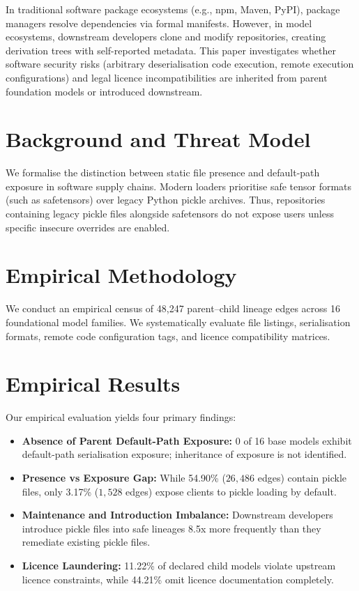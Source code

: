 \documentclass[conference]{IEEEtran}
\begin{document}
In traditional software package ecosystems (e.g., npm, Maven, PyPI), package managers resolve dependencies via formal manifests. However, in model ecosystems, downstream developers clone and modify repositories, creating derivation trees with self-reported metadata. This paper investigates whether software security risks (arbitrary deserialisation code execution, remote execution configurations) and legal licence incompatibilities are inherited from parent foundation models or introduced downstream.

\section{Background and Threat Model}
We formalise the distinction between static file presence and default-path exposure in software supply chains. Modern loaders prioritise safe tensor formats (such as safetensors) over legacy Python pickle archives. Thus, repositories containing legacy pickle files alongside safetensors do not expose users unless specific insecure overrides are enabled.

\section{Empirical Methodology}
We conduct an empirical census of 48,247 parent--child lineage edges across 16 foundational model families. We systematically evaluate file listings, serialisation formats, remote code configuration tags, and licence compatibility matrices.

\section{Empirical Results}
Our empirical evaluation yields four primary findings:
\begin{itemize}
    \item \textbf{Absence of Parent Default-Path Exposure:} 0 of 16 base models exhibit default-path serialisation exposure; inheritance of exposure is not identified.
    \item \textbf{Presence vs Exposure Gap:} While 54.90\% ($26{,}486$ edges) contain pickle files, only 3.17\% ($1{,}528$ edges) expose clients to pickle loading by default.
    \item \textbf{Maintenance and Introduction Imbalance:} Downstream developers introduce pickle files into safe lineages 8.5x more frequently than they remediate existing pickle files.
    \item \textbf{Licence Laundering:} 11.22\% of declared child models violate upstream licence constraints, while 44.21\% omit licence documentation completely.
\end{itemize}
\end{document}
